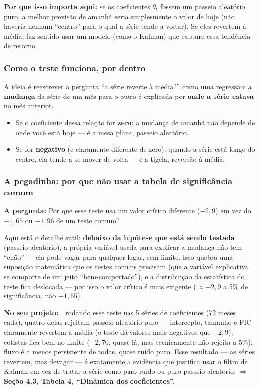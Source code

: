\documentclass[11pt,a4paper]{article}
\newcommand{\pergunta}[1]{\par\vspace{4pt}\noindent\textbf{\color{azul}A pergunta:} #1\par\vspace{2pt}}
\newcommand{\noprojeto}[0]{\par\vspace{4pt}\noindent\textbf{No seu projeto:}\ }
\begin{document}
\textbf{Por que isso importa aqui:} se os coeficientes $\theta_t$ fossem um passeio aleatório
puro, a melhor previsão de amanhã seria simplesmente o valor de hoje (não haveria nenhum ``centro''
para o qual a série tende a voltar). Se eles revertem à média, faz sentido usar um modelo (como o
Kalman) que capture essa tendência de retorno.

\subsubsection*{Como o teste funciona, por dentro}

A ideia é reescrever a pergunta ``a série reverte à média?'' como uma regressão: a \textbf{mudança}
da série de um mês para o outro é explicada por \textbf{onde a série estava} no mês anterior.

\begin{itemize}[topsep=2pt,itemsep=2pt]
\item Se o coeficiente dessa relação for \textbf{zero}: a mudança de amanhã não depende de onde
você está hoje --- é a mesa plana, passeio aleatório.
\item Se for \textbf{negativo} (e claramente diferente de zero): quando a série está longe do
centro, ela tende a se mover de volta --- é a tigela, reversão à média.
\end{itemize}

\subsubsection*{A pegadinha: por que não usar a tabela de significância comum}

\pergunta{Por que esse teste usa um valor crítico diferente ($-2{,}9$) em vez do $-1{,}65$ ou
$-1{,}96$ de um teste comum?}

Aqui está o detalhe sutil: \textbf{debaixo da hipótese que está sendo testada} (passeio
aleatório), a própria variável usada para explicar a mudança não tem ``chão'' --- ela pode vagar
para qualquer lugar, sem limite. Isso quebra uma suposição matemática que os testes comuns
precisam (que a variável explicativa se comporte de um jeito ``bem-comportado''), e a distribuição
da estatística do teste fica deslocada --- por isso o valor crítico é mais exigente
($\approx-2{,}9$ a 5\% de significância, não $-1{,}65$).

\noprojeto\ rodando esse teste nas 5 séries de coeficientes (72 meses cada), quatro delas
rejeitam passeio aleatório puro --- intercepto, tamanho e FIC claramente revertem à média (o teste
dá valores mais negativos que $-2{,}9$); cotistas fica bem no limite ($-2{,}70$, quase lá, mas
tecnicamente não rejeita a 5\%); fluxo é a menos persistente de todas, quase ruído puro. Esse
resultado --- as séries revertem, mas devagar --- é exatamente a evidência que justifica usar o
filtro de Kalman em vez de tratar a série como puro ruído ou puro passeio aleatório.
$\Rightarrow$ \textbf{Seção 4.3, Tabela 4, ``Dinâmica dos coeficientes''.}
\end{document}
